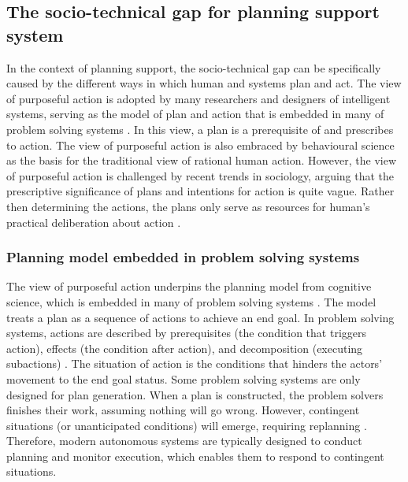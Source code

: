 \subsection{The socio-technical gap for planning support system}
In the context of planning support, the socio-technical gap can be specifically caused by the different ways in which human and systems plan and act. The view of purposeful action is adopted by many researchers and designers of intelligent systems, serving as the model of plan and action that is embedded in many of problem solving systems \citep{Allen1984}. In this view, a plan is a prerequisite of and prescribes to action. The view of purposeful action is also embraced by behavioural science as the basis for the traditional view of rational human action. However, the view of purposeful action is challenged by recent trends in sociology, arguing that the prescriptive significance of plans and intentions for action is quite vague. Rather then determining the actions, the plans only serve as resources for human's practical deliberation about action \citep{Suchman1987}.\\  

\subsubsection{Planning model embedded in problem solving systems }
The view of purposeful action underpins the planning model from cognitive science, which is embedded in many of problem solving systems \citep{Suchman1987}. The model treats a plan as a sequence of actions to achieve an end goal. In problem solving systems, actions are described by prerequisites (the condition that triggers action), effects (the condition after action), and decomposition (executing subactions) \citep{Allen1984}. The situation of action is the conditions that hinders the actors' movement to the end goal status. Some problem solving systems are only designed for plan generation. When a plan is constructed, the problem solvers finishes their work, assuming nothing will go wrong. However, contingent situations (or unanticipated conditions) will emerge, requiring replanning \citep{Suchman1987}. Therefore, modern autonomous systems are typically designed to conduct planning and monitor execution, which enables them to respond to contingent situations.\\


